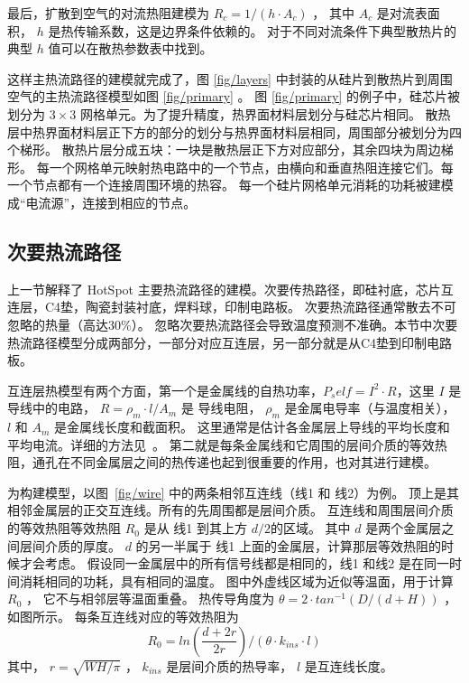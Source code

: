 最后，扩散到空气的对流热阻建模为 $R_c = 1/(h\cdot A_c)$ ， 其中 $A_c$ 是对流表面积， $h$ 是热传输系数，这是边界条件依赖的。
对于不同对流条件下典型散热片的典型 $h$ 值可以在散热参数表中找到。

这样主热流路径的建模就完成了，图 \ref{fig/layers} 中封装的从硅片到散热片到周围空气的主热流路径模型如图 \ref{fig/primary} 。 
图 \ref{fig/primary} 的例子中，硅芯片被划分为 $3 \times 3$ 网格单元。为了提升精度，热界面材料层划分与硅芯片相同。
散热层中热界面材料层正下方的部分的划分与热界面材料层相同，周围部分被划分为四个梯形。
散热片层分成五块：一块是散热层正下方对应部分，其余四块为周边梯形。
每一个网格单元映射热电路中的一个节点，由横向和垂直热阻连接它们。每一个节点都有一个连接周围环境的热容。
每一个硅片网格单元消耗的功耗被建模成“电流源”，连接到相应的节点。

\subsection{次要热流路径}\label{sec:secondary}

上一节解释了 HotSpot 主要热流路径的建模。次要传热路径，即硅衬底，芯片互连层，C4垫，陶瓷封装衬底，焊料球，印制电路板。
次要热流路径通常散去不可忽略的热量（高达$30\%$）。
忽略次要热流路径会导致温度预测不准确。本节中次要热流路径模型分成两部分，一部分对应互连层，另一部分就是从C4垫到印制电路板。

互连层热模型有两个方面，第一个是金属线的自热功率，$P_self = I^2\cdot R$，这里 $I$ 是导线中的电路，
$R = \rho_m \cdot l/A_m$ 是 导线电阻， $\rho_m$ 是金属电导率（与温度相关）， $l$ 和 $A_m$ 是金属线长度和截面积。
这里通常是估计各金属层上导线的平均长度和平均电流。详细的方法见~\cite{huang2004compact}。
第二就是每条金属线和它周围的层间介质的等效热阻，通孔在不同金属层之间的热传递也起到很重要的作用，也对其进行建模。


为构建模型，以图~\ref{fig/wire} 中的两条相邻互连线（线1 和 线2）为例。
顶上是其相邻金属层的正交互连线。所有的先周围都是层间介质。
互连线和周围层间介质的等效热阻等效热阻 $R_0$ 是从 线1 到其上方 $d/2$的区域。
其中 $d$ 是两个金属层之间层间介质的厚度。
$d$ 的另一半属于 线1 上面的金属层，计算那层等效热阻的时候才会考虑。
假设同一金属层中的所有信号线都是相同的，线1 和线2 是在同一时间消耗相同的功耗，具有相同的温度。
图中外虚线区域为近似等温面，用于计算 $R_0$ ， 它不与相邻层等温面重叠。
热传导角度为 $\theta = 2 \cdot tan^{-1}(D/(d+H))$ ，如图所示。
每条互连线对应的等效热阻为
\begin{equation}\label{eq:R0}
R_0 = ln(\frac{d+2r}{2r})/(\theta \cdot k_{ins} \cdot l)
\end{equation}
其中， $r = \sqrt{WH/\pi}$ ， $k_{ins}$ 是层间介质的热导率， $l$ 是互连线长度。


